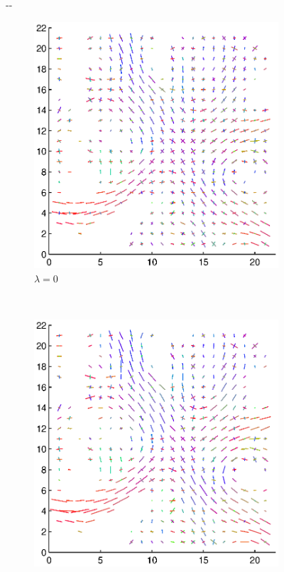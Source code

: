 \documentclass{article}
\begin{document}
\begin{figure}[H]
  \begin{adjustwidth}{-\oddsidemargin}{-\rightmargin}
  \centering
  \begin{subfigure}{0.3\paperwidth}
    \includegraphics[width=\textwidth]{figures/brain_bas_s=0.eps}
    \caption{$\lambda=0$}
  \end{subfigure}
  ~
  \begin{subfigure}{0.3\paperwidth}
    \includegraphics[width=\textwidth]{figures/brain_bas_s=4e4.eps}

\end{subfigure}
\end{adjustwidth}
\end{figure}
\end{document}
